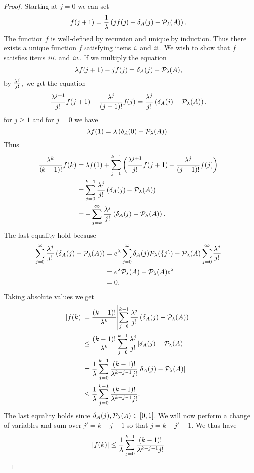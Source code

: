 \begin{proof}
    Starting at $j=0$ we can set 
    \[f(j+1) = \frac{1}{\lambda} \left(j f(j) +\delta_A(j)-{\mathcal{P}}_\lambda(A)\right). \]
    The function $f$ is well-defined by recursion and unique by induction. Thus there exists a unique function $f$ satisfying items \emph{i.} and \emph{ii.}. We wish to show that $f$ satisfies items \emph{iii.} and \emph{iv.}. If we multiply the equation 
    \[ \lambda f(j+1)-jf(j) = \delta_A(j)-{\mathcal{P}}_\lambda(A),\]
    by $\frac{\lambda^j}{j!}$, we get the equation 
    \[\frac{\lambda^{j+1}}{j!}f(j+1) - \frac{\lambda^j}{(j-1)!}f(j) = \frac{\lambda^j}{j!}\left(\delta_A(j)-{\mathcal{P}}_\lambda(A)\right), \]
    for $j \ge 1$ and for $j=0$ we have
    \[\lambda f(1)=\lambda \left(\delta_A(0)-{\mathcal{P}}_\lambda(A)\right). \]
    Thus 
    \begin{align*}
        \frac{\lambda^k}{(k-1)!}f(k)&=\lambda f(1)+\sum_{j=1}^{k-1} \left(\frac{\lambda^{j+1}}{j!}f(j+1)-\frac{\lambda^j}{(j-1)!} f(j)\right)\\
        &=\sum_{j=0}^{k-1} \frac{\lambda^j}{j!}\left(\delta_A(j)-{\mathcal{P}}_\lambda(A)\right)\\
        &=-\sum_{j=k}^\infty \frac{\lambda^j}{j!}\left(\delta_A(j)-{\mathcal{P}}_\lambda(A)\right).
    \end{align*}
    The last equality hold because  
    \begin{align*}
        \sum_{j=0}^\infty \frac{\lambda^j}{j!}\left(\delta_A(j)-{\mathcal{P}}_\lambda(A)\right)&=e^\lambda \sum_{j=0}^\infty \delta_A(j){\mathcal{P}}_\lambda(\{j\}) - {\mathcal{P}}_\lambda(A)\sum_{j=0}^\infty \frac{\lambda^j}{j!}\\
        &=e^\lambda {\mathcal{P}}_\lambda(A) - {\mathcal{P}}_\lambda(A)e^{\lambda}\\
        &=0.
    \end{align*}
    Taking absolute values we get
    \begin{align*}
        {\left\lvert f(k)\right\rvert} &= \frac{(k-1)!}{\lambda^k}{\left\lvert\sum_{j=0}^{k-1}\frac{\lambda^j}{j!}\left(\delta_A(j)-{\mathcal{P}}_\lambda(A)\right)\right\rvert}\\
        &\le\frac{(k-1)!}{\lambda^k}\sum_{j=0}^{k-1}\frac{\lambda^j}{j!}{\left\lvert\delta_A(j)-{\mathcal{P}}_\lambda(A)\right\rvert}\\
        &=\frac{1}{\lambda}\sum_{j=0}^{k-1}\frac{(k-1)!}{\lambda^{k-j-1}j!}{\left\lvert\delta_A(j)-{\mathcal{P}}_\lambda(A)\right\rvert}\\
        &\le \frac{1}{\lambda}\sum_{j=0}^{k-1}\frac{(k-1)!}{\lambda^{k-j-1}j!}.
    \end{align*}
    The last equality holds since $\delta_A(j),{\mathcal{P}}_\lambda(A) \in [0,1]$. We will now perform a change of variables and sum over $j' = k-j-1$ so that $j =k-j'-1$. We thus have
    \begin{align*}
        \abs{f(k)}&\le \frac{1}{\la}\sum_{j=0}^{k-1}\frac{(k-1)!}{\la^{k-j-1}j!}\\

\end{align*}
\end{proof}

